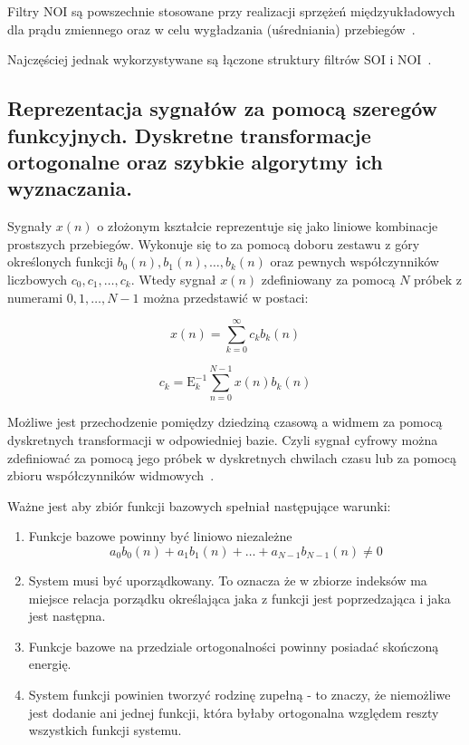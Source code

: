 \documentclass[wi]{zut}
\begin{document}
Filtry NOI są powszechnie stosowane przy realizacji sprzężeń międzyukładowych dla prądu zmiennego oraz w celu wygładzania (uśredniania) przebiegów~\cite{Cariow_7}.

Najczęściej jednak wykorzystywane są łączone struktury filtrów SOI i NOI~\cite{Cariow_7}.

\subsection{Reprezentacja sygnałów za pomocą szeregów funkcyjnych. Dyskretne transformacje ortogonalne oraz szybkie algorytmy ich wyznaczania.}

Sygnały $x(n)$ o złożonym kształcie reprezentuje się jako liniowe kombinacje prostszych przebiegów. Wykonuje się to za pomocą doboru zestawu z góry określonych funkcji $b_0(n), b_1(n), \ldots, b_k(n)$ oraz pewnych współczynników liczbowych $c_0, c_1, \ldots, c_k$. Wtedy sygnał $x(n)$ zdefiniowany za pomocą $N$ próbek z numerami $0, 1, \ldots, N-1$ można przedstawić w postaci:

\begin{equation}
    x(n)=\sum_{k=0}^{\infty} c_{k} b_{k}(n)
\end{equation}

\begin{equation}
    c_{k}=\mathrm{E}_{k}^{-1} \sum_{n=0}^{N-1} x(n) b_{k}(n)
\end{equation}

Możliwe jest przechodzenie pomiędzy dziedziną czasową a widmem za pomocą dyskretnych transformacji w odpowiedniej bazie. Czyli sygnał cyfrowy można zdefiniować za pomocą jego próbek w dyskretnych chwilach czasu lub za pomocą zbioru współczynników widmowych~\cite{Cariow_6}.

Ważne jest aby zbiór funkcji bazowych spełniał następujące warunki:

\begin{enumerate}
    \item Funkcje bazowe powinny być liniowo niezależne
    $$a_{0} b_{0}(n)+a_{1} b_{1}(n)+\ldots+a_{N-1} b_{N-1}(n) \neq 0$$
    \item System musi być uporządkowany. To oznacza że w zbiorze indeksów ma miejsce relacja porządku określająca jaka z funkcji jest poprzedzająca i jaka jest następna.
    \item Funkcje bazowe na przedziale ortogonalności powinny posiadać skończoną energię.
    \item System funkcji powinien tworzyć rodzinę zupełną - to znaczy, że niemożliwe jest dodanie ani jednej funkcji, która byłaby ortogonalna względem reszty wszystkich funkcji systemu.
\end{enumerate}
\end{document}
